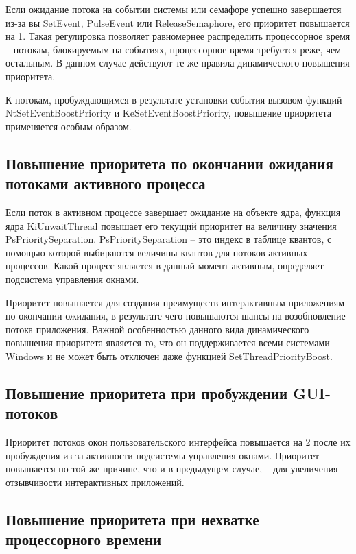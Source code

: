 Если ожидание потока на событии системы или семафоре успешно завершается из-за вы {\ttfamily SetEvent}, {\ttfamily PulseEvent} или {\ttfamily ReleaseSemaphore}, его приоритет повышается на 1.
Такая регулировка позволяет равномернее распределить процессорное время -- потокам, блокируемым на событиях, процессорное время требуется реже, чем остальным. В данном случае действуют те же правила динамического повышения приоритета.

К потокам, пробуждающимся в результате установки события вызовом функций {\ttfamily NtSetEventBoostPriority} и {\ttfamily KeSetEventBoostPriority}, повышение приоритета применяется особым образом.

\subsection{Повышение приоритета по окончании ожидания потоками активного процесса}

Если поток в активном процессе завершает ожидание на объекте ядра, функция ядра {\ttfamily KiUnwaitThread} повышает его текущий приоритет на величину значения {\ttfamily PsPrioritySeparation}. {\ttfamily PsPrioritySeparation} -- это индекс в таблице квантов, с помощью которой выбираются величины квантов для потоков активных процессов. Какой процесс является в данный момент активным, определяет подсистема управления окнами.

Приоритет повышается для создания преимуществ интерактивным приложениям по окончании ожидания, в результате чего повышаются шансы на возобновление потока приложения.
Важной особенностью данного вида динамического повышения приоритета является то, что он поддерживается всеми системами Windows и не может быть отключен даже функцией {\ttfamily SetThreadPriorityBoost}.

\subsection{Повышение приоритета при пробуждении GUI-потоков}

Приоритет потоков окон пользовательского интерфейса повышается на 2 после их пробуждения из-за активности подсистемы управления окнами. Приоритет повышается по той же причине, что и в предыдущем случае, -- для увеличения отзывчивости интерактивных приложений.

\subsection{Повышение приоритета при нехватке процессорного времени}

